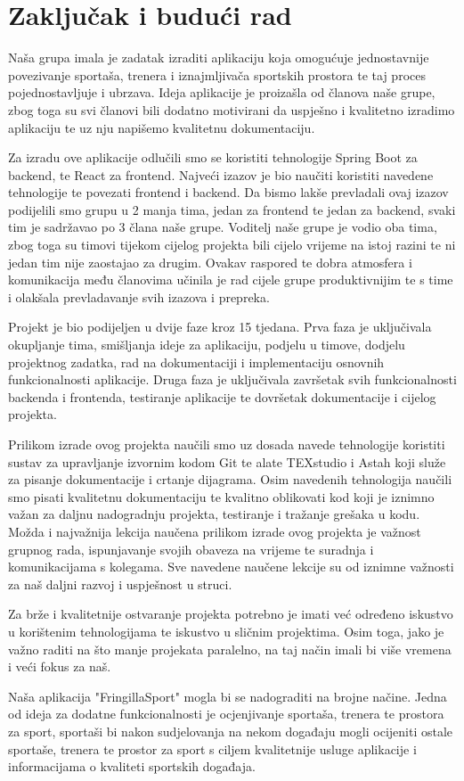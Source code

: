 \chapter{Zaključak i budući rad}
		
		Naša grupa imala je zadatak izraditi aplikaciju koja omogućuje jednostavnije povezivanje sportaša, trenera i iznajmljivača sportskih prostora te taj proces pojednostavljuje i ubrzava. Ideja aplikacije je proizašla od članova naše grupe, zbog toga su svi članovi bili dodatno motivirani da uspješno i kvalitetno izradimo aplikaciju te uz nju napišemo kvalitetnu dokumentaciju. 
		
		Za izradu ove aplikacije odlučili smo se koristiti tehnologije Spring Boot za backend, te React za frontend. Najveći izazov je bio naučiti koristiti navedene tehnologije te povezati frontend i backend. Da bismo lakše prevladali ovaj izazov podijelili smo grupu u 2 manja tima, jedan za frontend te jedan za backend, svaki tim je sadržavao po 3 člana naše grupe. Voditelj naše grupe je vodio oba tima, zbog toga su timovi tijekom cijelog projekta bili cijelo vrijeme na istoj razini te ni jedan tim nije zaostajao za drugim. Ovakav raspored te dobra atmosfera i komunikacija među članovima učinila je rad cijele grupe produktivnijim te s time i olakšala prevladavanje svih izazova i prepreka.
		
		Projekt je bio podijeljen u dvije faze kroz 15 tjedana. Prva faza je uključivala okupljanje tima, smišljanja ideje za aplikaciju, podjelu u timove, dodjelu projektnog zadatka, rad na dokumentaciji i implementaciju osnovnih funkcionalnosti aplikacije. Druga faza je uključivala završetak svih funkcionalnosti backenda i frontenda, testiranje aplikacije te dovršetak dokumentacije i cijelog projekta.
		
		Prilikom izrade ovog projekta naučili smo uz dosada navede tehnologije koristiti sustav za upravljanje izvornim kodom Git te alate TEXstudio i Astah koji služe za pisanje dokumentacije i crtanje dijagrama. Osim navedenih tehnologija naučili smo pisati kvalitetnu dokumentaciju te kvalitno oblikovati kod koji je iznimno važan za daljnu nadogradnju projekta, testiranje i tražanje grešaka u kodu. Možda i najvažnija lekcija naučena prilikom izrade ovog projekta je važnost grupnog rada, ispunjavanje svojih obaveza na vrijeme te suradnja i komunikacijama s kolegama. Sve navedene naučene lekcije su od iznimne važnosti za naš daljni razvoj i uspješnost u struci.
		
		
		Za brže i kvalitetnije ostvaranje projekta potrebno je imati već određeno iskustvo u korištenim tehnologijama te iskustvo u sličnim projektima. Osim toga, jako je važno raditi na što manje projekata paralelno, na taj način imali bi više vremena i veći fokus za naš.
		
		Naša aplikacija "FringillaSport" mogla bi se nadograditi na brojne načine. Jedna od ideja za dodatne funkcionalnosti je ocjenjivanje sportaša, trenera te prostora za sport, sportaši bi nakon sudjelovanja na nekom događaju mogli ocijeniti ostale sportaše, trenera te prostor za sport s ciljem kvalitetnije usluge aplikacije i informacijama o kvaliteti sportskih događaja.
		
		
		